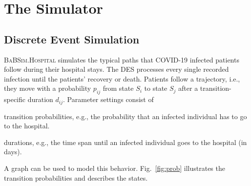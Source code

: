 \documentclass[conference]{IEEEtran}
\def\figref#1{Fig.~\ref{#1}}
\newcommand{\babsimhospital}{\textsc{BaBSim.Hospital}\xspace}
\begin{document}
\section{The Simulator}\label{sec:sim}
\subsection{Discrete Event Simulation}
\babsimhospital simulates the typical paths that COVID-19 infected patients follow during their hospital stays. 
The \gls{DES} processes every single recorded infection until the patients' recovery or death. 
Patients follow a trajectory, i.e., they move with a probability $p_{ij}$ from state $S_i$ to state $S_j$  after a transition-specific duration $d_{ij}$.
Parameter settings consist of
\begin{compactitem}
\item transition probabilities, e.g., the probability that an infected
   individual has to go to the hospital. 
\item  durations, e.g., the time span until an infected individual goes to the
   hospital (in days). 
\end{compactitem}
A graph can be used to model this behavior.
\figref{fig:prob} illustrates the transition probabilities and describes the states.
\end{document}
